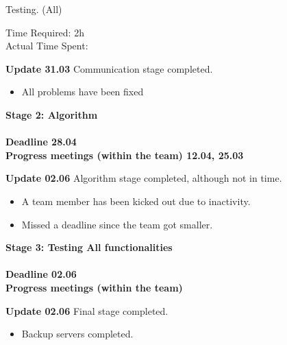\documentclass{article}
\begin{document}
\begin{itemize}
\begin{itemize}
\begin{enumerate}
			
					{\bf \item Testing. (All) \\}
					Time Required: 2h \\ 
					Actual Time Spent: \\
										
			\end{enumerate}

	\end{itemize}

	{\large \bf	Update 31.03}
	Communication stage completed.
	\begin{itemize}
		\item All problems have been fixed
	\end{itemize}
	
	
	\newpage

{\item \large \bf Stage 2: Algorithm \\ \\
	Deadline 28.04 \\
	Progress meetings (within the team) 12.04, 25.03 \\}
	
	{\large \bf	Update 02.06}
	Algorithm stage completed, although not in time.

	\begin{itemize}
		\item A team member has been kicked out due to inactivity.
		\item Missed a deadline since the team got smaller.
	\end{itemize}


{\item \large \bf Stage 3: Testing All functionalities \\ \\
	Deadline 02.06 \\
	Progress meetings (within the team) \\}


\end{itemize}

	{\large \bf	Update 02.06}
	Final stage completed.

	\begin{itemize}
		\item Backup servers completed.
	\end{itemize}
\end{document}
